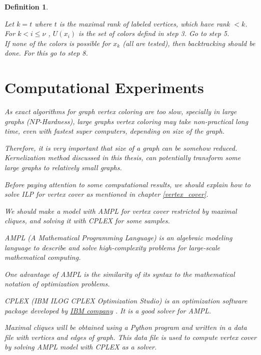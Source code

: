\documentclass[12pt]{article}
\theoremstyle{slplain}
\newtheorem{defi}{Definition}
\begin{document}
\begin{defi}
\begin{algorithm}[H]
{\nl Let $k = t$ where $t$ is the maximal rank of labeled vertices, which have rank $< k$. For $k < i \leq \nu$ , $U(x_i)$ is the set of colors defind in step 3. Go to step 5.\\


\nl If none of the colors is possible for $x_k$ (all are tested), then backtracking
should be done. For this go to step 8.\\}
\end{algorithm}
\restoregeometry

\newpage


\section{Computational Experiments}\label{exp}

As exact algorithms for graph vertex coloring are too slow, specially in large 
graphs ($NP$-Hardness), large graphs vertex coloring 
may take non-practical long time, even with fastest super computers, depending on size of the graph. 

Therefore, it is very important that size of a graph can be somehow reduced. 
Kernelization method discussed in this thesis, can potentially transform some large graphs to relatively small
graphs. 

Before paying attention to some computational results, we should explain how to solve ILP for vertex cover as mentioned in chapter \ref{vertex_cover}.

We should make a model with AMPL\cite{ampl} for vertex cover restricted by
maximal cliques, and solving it with CPLEX\cite{cplex} for some samples.

AMPL (A Mathematical Programming Language) is an algebraic modeling language to describe and solve high-complexity problems for large-scale mathematical computing. 

One advantage of AMPL is the similarity of its syntax to the mathematical notation of optimization problems.

CPLEX (IBM ILOG CPLEX Optimization Studio) is an optimization software package developed by \href{https://www.ibm.com/us-en/}{IBM company} \cite{IBM}. It is a good solver for AMPL.

Maximal cliques will be obtained using a Python program and written in a data file 
with vertices and edges of graph. This data file is used to compute vertex cover by solving AMPL model with CPLEX as a solver.




\end{defi}
\end{document}

